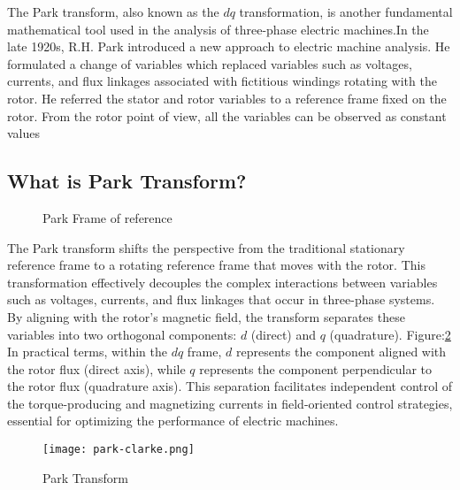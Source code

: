 The Park transform, also known as the \( dq \) transformation, is another
fundamental mathematical tool used in the analysis of three-phase electric
machines.In the late 1920s, R.H. Park\cite{R. H. Park} introduced a new
approach to electric machine analysis. He formulated a change of variables
which replaced variables such as voltages, currents, and flux linkages
associated with fictitious windings rotating with the rotor. He referred the
stator and rotor variables to a reference frame fixed on the rotor. From the
rotor point of view, all the variables can be observed as constant values
\subsection{What is Park Transform?}
\begin{figure}[ht]
    \centering
    \caption{Park Frame of reference}
    \label{Park Frame of reference}
\end{figure}
The Park transform shifts the perspective from the traditional stationary
reference frame to a rotating reference frame that moves with the rotor. This
transformation effectively decouples the complex interactions between variables
such as voltages, currents, and flux linkages that occur in three-phase
systems. By aligning with the rotor's magnetic field, the transform separates
these variables into two orthogonal components: \( d \) (direct) and \( q \)
(quadrature). Figure:\ref{fig:Park Transform}\\

In practical terms, within the \( dq \) frame, \( d \) represents the component
aligned with the rotor flux (direct axis), while \( q \) represents the
component perpendicular to the rotor flux (quadrature axis). This separation
facilitates independent control of the torque-producing and magnetizing
currents in field-oriented control strategies, essential for optimizing the
performance of electric machines.
\begin{figure}[h]
    \centering
    \texttt{[image: park-clarke.png]}
    \caption{Park Transform}
    \label{fig:Park Transform}
\end{figure}

